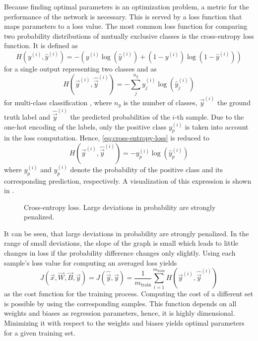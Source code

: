 Because finding optimal parameters is an optimization problem, a metric for the performance of the network is necessary.
This is served by a loss function that maps parameters to a loss value.
The most common loss function for comparing two probability distributions of mutually exclusive classes is the cross-entropy loss function.
It is defined as
\begin{equation}
	H(y^{(i)},\hat{y}^{(i)}) = -(y^{(i)} \log(\hat{y}^{(i)}) + (1-y^{(i)}) \log(1-\hat{y}^{(i)}))
\end{equation}
for a single output representing two classes and as
\begin{equation}
	\label{eq:cross-entropy-loss}
	H(\vec{y}^{(i)}, \hat{\vec{y}}^{(i)}) = - \sum_{j}^{n_y} y_j^{(i)} \log (\hat{y}_j^{(i)})
\end{equation}
for multi-class classification \cite{murphy2013machine}, where $n_y$ is the number of classes, $\vec{y}^{(i)}$ the ground truth label and $\hat{\vec{y}}^{(i)}$ the predicted probabilities of the $i$-th sample.
Due to the one-hot encoding of the labels, only the positive class $y_p^{(i)}$ is taken into account in the loss computation.
Hence, \eqref{eq:cross-entropy-loss} is reduced to
\begin{equation}
	\label{eq:cross-entropy-loss-compact}
	H(\vec{y}^{(i)}, \hat{\vec{y}}^{(i)}) = - y_p^{(i)} \log (\hat{y}_p^{(i)})
\end{equation}
where $y_p^{(i)}$ and $\hat{y}_p^{(i)}$ denote the probability of the positive class and its corresponding prediction, respectively.
A visualization of this expression is shown in .
\begin{figure}
	\setlength{}
	\setlength{}
	\centering
	
	\caption[Cross-entropy loss]{Cross-entropy loss. Large deviations in probability are strongly penalized.}
	\label{fig:cross-entropy}
\end{figure}
It can be seen, that large deviations in probability are strongly penalized.
In the range of small deviations, the slope of the graph is small which leads to little changes in loss if the probability difference changes only slightly.
Using each sample's loss value for computing an averaged loss yields
\begin{equation}
	\label{eq:cross-entropy-cost}
	J(\vec{x}, \vec{W}, \vec{B}, \vec{y}) = J(\hat{\vec{y}}, \vec{y}) = \frac{1}{m_{\text{train}}} \sum_{i=1}^{m_{\text{train}}} H(\vec{y}^{(i)}, \hat{\vec{y}}^{(i)})
\end{equation}
as the cost function for the training process.
Computing the cost of a different set is possible by using the corresponding samples.
This function depends on all weights and biases as regression parameters, hence, it is highly dimensional.
Minimizing it with respect to the weights and biases yields optimal parameters for a given training set.